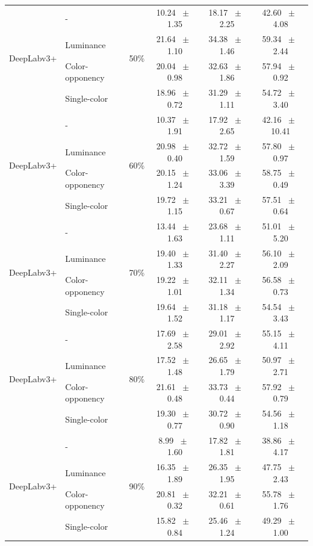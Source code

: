 \begin{table}[h]
\begin{tabular}{@{}l l c c c c@{}}
    \multirow{4}{*}{DeepLabv3+} & - & \multirow{4}{*}{50\%} & 10.24 ~$\pm$~ 1.35 & 18.17 ~$\pm$~ 2.25 & 42.60 ~$\pm$~ 4.08 \\
    & Luminance &  & 21.64 ~$\pm$~ 1.10 & 34.38 ~$\pm$~ 1.46 & 59.34 ~$\pm$~ 2.44 \\
    & Color-opponency &  & 20.04 ~$\pm$~ 0.98 & 32.63 ~$\pm$~ 1.86 & 57.94 ~$\pm$~ 0.92 \\
    & Single-color &  & 18.96 ~$\pm$~ 0.72 & 31.29 ~$\pm$~ 1.11 & 54.72 ~$\pm$~ 3.40 \\
    \midrule
    \multirow{4}{*}{DeepLabv3+} & - & \multirow{4}{*}{60\%} & 10.37 ~$\pm$~ 1.91 & 17.92 ~$\pm$~ 2.65 & 42.16 ~$\pm$~ 10.41 \\
    & Luminance &  & 20.98 ~$\pm$~ 0.40 & 32.72 ~$\pm$~ 1.59 & 57.80 ~$\pm$~ 0.97 \\
    & Color-opponency &  & 20.15 ~$\pm$~ 1.24 & 33.06 ~$\pm$~ 3.39 & 58.75 ~$\pm$~ 0.49 \\
    & Single-color &  & 19.72 ~$\pm$~ 1.15 & 33.21 ~$\pm$~ 0.67 & 57.51 ~$\pm$~ 0.64 \\
    \midrule
    \multirow{4}{*}{DeepLabv3+} & - & \multirow{4}{*}{70\%} & 13.44 ~$\pm$~ 1.63 & 23.68 ~$\pm$~ 1.11 & 51.01 ~$\pm$~ 5.20 \\
    & Luminance &  & 19.40 ~$\pm$~ 1.33 & 31.40 ~$\pm$~ 2.27 & 56.10 ~$\pm$~ 2.09 \\
    & Color-opponency &  & 19.22 ~$\pm$~ 1.01 & 32.11 ~$\pm$~ 1.34 & 56.58 ~$\pm$~ 0.73 \\
    & Single-color &  & 19.64 ~$\pm$~ 1.52 & 31.18 ~$\pm$~ 1.17 & 54.54 ~$\pm$~ 3.43 \\
    \midrule
    \multirow{4}{*}{DeepLabv3+} & - & \multirow{4}{*}{80\%} & 17.69 ~$\pm$~ 2.58 & 29.01 ~$\pm$~ 2.92 & 55.15 ~$\pm$~ 4.11 \\
    & Luminance &  & 17.52 ~$\pm$~ 1.48 & 26.65 ~$\pm$~ 1.79 & 50.97 ~$\pm$~ 2.71 \\
    & Color-opponency &  & 21.61 ~$\pm$~ 0.48 & 33.73 ~$\pm$~ 0.44 & 57.92 ~$\pm$~ 0.79 \\
    & Single-color &  & 19.30 ~$\pm$~ 0.77 & 30.72 ~$\pm$~ 0.90 & 54.56 ~$\pm$~ 1.18 \\
    \midrule
    \multirow{4}{*}{DeepLabv3+} & - & \multirow{4}{*}{90\%} & 8.99 ~$\pm$~ 1.60 & 17.82 ~$\pm$~ 1.81 & 38.86 ~$\pm$~ 4.17 \\
    & Luminance &  & 16.35 ~$\pm$~ 1.89 & 26.35 ~$\pm$~ 1.95 & 47.75 ~$\pm$~ 2.43 \\
    & Color-opponency &  & 20.81 ~$\pm$~ 0.32 & 32.21 ~$\pm$~ 0.61 & 55.78 ~$\pm$~ 1.76 \\
    & Single-color &  & 15.82 ~$\pm$~ 0.84 & 25.46 ~$\pm$~ 1.24 & 49.29 ~$\pm$~ 1.00 \\
    \midrule
    \bottomrule
  \end{tabular}
  \label{tab:deeplabv3plus_acdc_night}
\end{table}